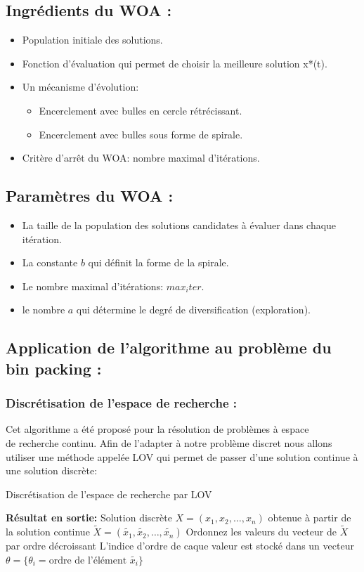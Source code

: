 \documentclass[12pt]{article}
\begin{document}
\subsection{Ingrédients du WOA :}
\begin{itemize}
    \item Population initiale des solutions.
    \item Fonction d’évaluation qui permet de choisir la meilleure solution x*(t).
    \item Un mécanisme d'évolution:
    \begin{itemize}
        \item Encerclement avec bulles en cercle rétrécissant.
        \item Encerclement avec bulles sous forme de spirale.
    \end{itemize}
    \item Critère d'arrêt du WOA: nombre maximal d’itérations.    
\end{itemize}
\subsection{Paramètres du WOA :}
\begin{itemize}
    \item La taille de la population des solutions candidates à évaluer dans chaque itération.
    \item La constante \(b\) qui définit la forme de la spirale.
    \item Le nombre maximal d’itérations: \(max_iter\).
    \item le nombre \(a\) qui détermine le degré de diversification (exploration).    
\end{itemize}
\subsection{Application de l’algorithme au problème du bin packing :}
\subsubsection{Discrétisation de l'espace de recherche :}
Cet algorithme a été proposé pour la résolution de problèmes à espace \\ de recherche continu. Afin de l’adapter à notre problème discret nous allons utiliser une méthode appelée LOV qui permet de passer d’une solution continue à une solution discrète:\\
\begin{algorithm}[H]
    \caption{Discrétisation de l'espace de recherche par LOV}
    \begin{algorithmic}
        \STATE \textbf{Résultat en sortie:} Solution discrète \(X = (x_1, x_2, \dots, x_n)\) obtenue à partir de la solution continue \(\tilde{X} = (\tilde{x_1}, \tilde{x_2}, \dots, \tilde{x_n})\)\;
        \STATE Ordonnez les valeurs du vecteur de \(\tilde{X}\) par ordre décroissant\;
        \STATE L'indice d'ordre de caque valeur est stocké dans un vecteur \(\theta = \{ \theta_i = \text{ordre de l'élément } \tilde{x_i}\}\)\;
    \end{algorithmic}  
\end{algorithm}
\end{document}
